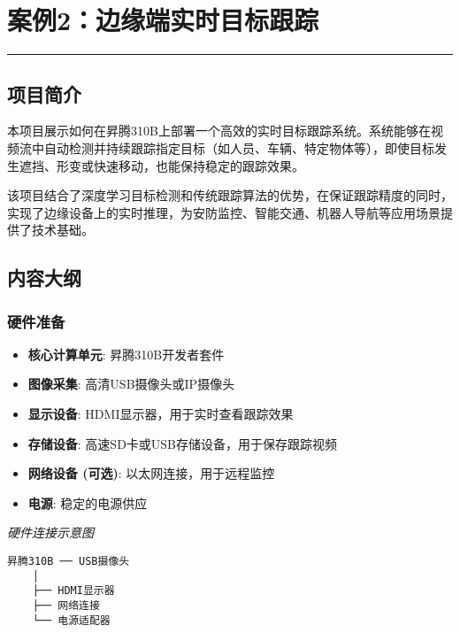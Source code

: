 \chapter{案例2：边缘端实时目标跟踪}\label{ux6848ux4f8b2ux8fb9ux7f18ux7aefux5b9eux65f6ux76eeux6807ux8ddfux8e2a}

\begin{center}\rule{0.5\linewidth}{0.5pt}\end{center}

\section{项目简介}\label{ux9879ux76eeux7b80ux4ecb}

本项目展示如何在昇腾310B上部署一个高效的实时目标跟踪系统。系统能够在视频流中自动检测并持续跟踪指定目标（如人员、车辆、特定物体等），即使目标发生遮挡、形变或快速移动，也能保持稳定的跟踪效果。

该项目结合了深度学习目标检测和传统跟踪算法的优势，在保证跟踪精度的同时，实现了边缘设备上的实时推理，为安防监控、智能交通、机器人导航等应用场景提供了技术基础。

\section{内容大纲}\label{ux5185ux5bb9ux5927ux7eb2}

\subsection{硬件准备}\label{ux786cux4ef6ux51c6ux5907}

\begin{itemize}
\tightlist
\item
  \textbf{核心计算单元}: 昇腾310B开发者套件
\item
  \textbf{图像采集}: 高清USB摄像头或IP摄像头
\item
  \textbf{显示设备}: HDMI显示器，用于实时查看跟踪效果
\item
  \textbf{存储设备}: 高速SD卡或USB存储设备，用于保存跟踪视频
\item
  \textbf{网络设备 (可选)}: 以太网连接，用于远程监控
\item
  \textbf{电源}: 稳定的电源供应
\end{itemize}

\emph{硬件连接示意图}

\begin{lstlisting}
昇腾310B ── USB摄像头
    │
    ├── HDMI显示器
    ├── 网络连接
    └── 电源适配器
\end{lstlisting}

